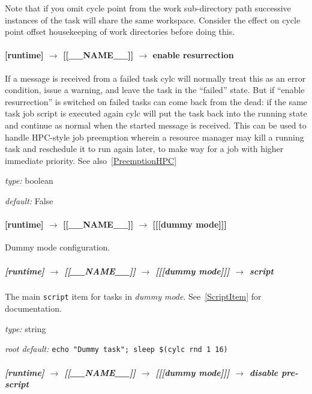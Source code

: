 Note that if you omit cycle point from the work sub-directory path successive
instances of the task will share the same workspace.  Consider the effect on
cycle point offset housekeeping of work directories before doing this.

\paragraph[enable resurrection]{ [runtime] $\rightarrow$ [[\_\_NAME\_\_]] $\rightarrow$ enable resurrection}

If a message is received from a failed task cylc will normally treat
this as an error condition, issue a warning, and leave the task in the
``failed'' state.  But if ``enable resurrection'' is switched on failed
tasks can come back from the dead: if the same task job script is
executed again cylc will put the task back into the running state and
continue as normal when the started message is received. This can be
used to handle HPC-style job preemption wherein a resource manager may
kill a running task and reschedule it to run again later, to make way
for a job with higher immediate priority. See also~\ref{PreemptionHPC}
\begin{myitemize}
\item {\em type:} boolean
\item {\em default:} False
\end{myitemize}


\paragraph[{[[[}dummy mode{]]]}]{[runtime] $\rightarrow$ [[\_\_NAME\_\_]] $\rightarrow$ [[[dummy mode]]]}

Dummy mode configuration.

\subparagraph[script]{[runtime] $\rightarrow$ [[\_\_NAME\_\_]] $\rightarrow$ [[[dummy mode]]] $\rightarrow$ script}

The main \lstinline=script= item for tasks in {\em dummy mode}.
See~\ref{ScriptItem} for documentation.

\begin{myitemize}
\item {\em type:} string
\item {\em root default:} \lstinline=echo "Dummy task"; sleep $(cylc rnd 1 16)=
\end{myitemize}

\subparagraph[disable pre-script]{[runtime] $\rightarrow$ [[\_\_NAME\_\_]] $\rightarrow$ [[[dummy mode]]] $\rightarrow$ disable pre-script}

